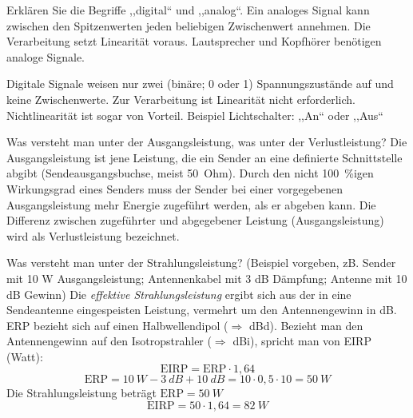 \documentclass[avery5371,grid,frame,a4paper]{flashcards}
\newcommand{\card}[3]{
  \begin{flashcard}[{\chap} -- #1]{#2}#3\end{flashcard}
}
\begin{document}
\card{27}{Erklären Sie die Begriffe ,,digital`` und ,,analog``.}{
  Ein analoges Signal kann zwischen den Spitzenwerten jeden beliebigen Zwischenwert annehmen. Die Verarbeitung setzt Linearität voraus. Lautsprecher und Kopfhörer benötigen analoge Signale.

  Digitale Signale weisen nur zwei (binäre; 0 oder 1) Spannungszustände auf und keine Zwischenwerte. Zur Verarbeitung ist Linearität nicht erforderlich. Nichtlinearität ist sogar von Vorteil. Beispiel Lichtschalter: ,,An`` oder ,,Aus``}
\card{28}{Was versteht man unter der Ausgangsleistung, was unter der Verlustleistung?}{
  Die Ausgangsleistung ist jene Leistung, die ein Sender an eine definierte Schnittstelle abgibt (Sendeausgangsbuchse, meist 50~Ohm). Durch den nicht 100~\%igen Wirkungsgrad eines Senders muss der Sender bei einer vorgegebenen Ausgangsleistung mehr Energie zugeführt werden, als er abgeben kann. Die Differenz zwischen zugeführter und abgegebener Leistung (Ausgangsleistung) wird als Verlustleistung bezeichnet.
}
\card{29}{Was versteht man unter der Strahlungsleistung? (Beispiel vorgeben, zB. Sender mit 10 W Ausgangsleistung; Antennenkabel mit 3 dB Dämpfung; Antenne mit 10 dB Gewinn)}{
  \small
  Die \emph{effektive Strahlungsleistung} ergibt sich aus der in eine Sendeantenne eingespeisten Leistung, vermehrt um den Antennengewinn in dB. ERP bezieht sich auf einen Halbwellendipol ($\Rightarrow$ dBd). Bezieht man den Antennengewinn auf den Isotropstrahler ($\Rightarrow$ dBi), spricht man von EIRP (Watt):
  \[ \text{EIRP} = \text{ERP} \cdot 1,64 \]
  \[ \text{ERP} = 10~W- 3~dB + 10~dB = 10 \cdot 0,5 \cdot 10 = 50~W \]
  Die Strahlungsleistung beträgt $\text{ERP} = 50~W$
  \[ \text{EIRP} = 50 \cdot 1,64 = 82~W \]
}
\end{document}
